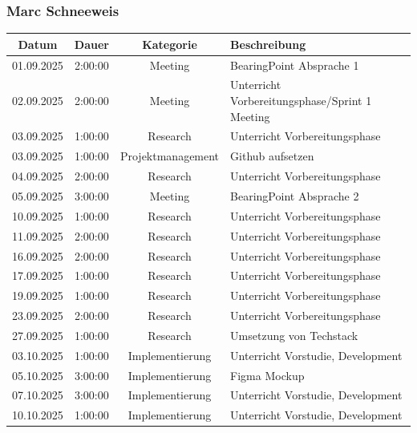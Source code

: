 \documentclass{article}
\begin{document}
\subsubsection*{Marc Schneeweis}
\begin{table}[H]
  \centering
  \begin{tabularx}{\textwidth}{|c|c|c|X|}
    \hline
    \rowcolor{black!10}\textbf{Datum} & \textbf{Dauer} & \textbf{Kategorie} & \textbf{Beschreibung} \\
    \hline
    01.09.2025 & 2:00:00 & Meeting           & BearingPoint Absprache 1 \\ \hline
    02.09.2025 & 2:00:00 & Meeting           & Unterricht Vorbereitungsphase/Sprint 1 Meeting \\ \hline
    03.09.2025 & 1:00:00 & Research          & Unterricht Vorbereitungsphase \\ \hline
    03.09.2025 & 1:00:00 & Projektmanagement & Github aufsetzen \\ \hline
    04.09.2025 & 2:00:00 & Research          & Unterricht Vorbereitungsphase \\ \hline
    05.09.2025 & 3:00:00 & Meeting           & BearingPoint Absprache 2 \\ \hline
    10.09.2025 & 1:00:00 & Research          & Unterricht Vorbereitungsphase \\ \hline
    11.09.2025 & 2:00:00 & Research          & Unterricht Vorbereitungsphase \\ \hline
    16.09.2025 & 2:00:00 & Research          & Unterricht Vorbereitungsphase \\ \hline
    17.09.2025 & 1:00:00 & Research          & Unterricht Vorbereitungsphase \\ \hline
    19.09.2025 & 1:00:00 & Research          & Unterricht Vorbereitungsphase \\ \hline
    23.09.2025 & 2:00:00 & Research          & Unterricht Vorbereitungsphase \\ \hline
    27.09.2025 & 1:00:00 & Research          & Umsetzung von Techstack \\ \hline
    03.10.2025 & 1:00:00 & Implementierung   & Unterricht Vorstudie, Development \\ \hline
    05.10.2025 & 3:00:00 & Implementierung   & Figma Mockup \\ \hline
    07.10.2025 & 3:00:00 & Implementierung   & Unterricht Vorstudie, Development \\ \hline
    10.10.2025 & 1:00:00 & Implementierung   & Unterricht Vorstudie, Development \\ \hline

\end{tabularx}
\end{table}
\end{document}
